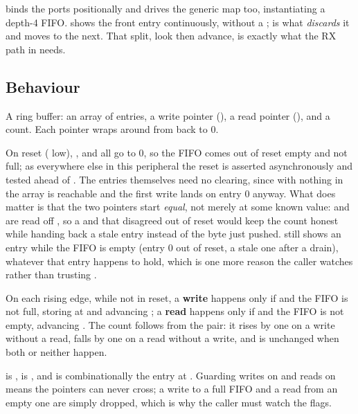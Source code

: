  binds the ports positionally and drives the generic map too, instantiating a depth-4
FIFO.  shows the front entry continuously, without a ;  is what
\emph{discards} it and moves to the next. That split, look then advance, is exactly what the RX path
in  needs.

\subsection{Behaviour}
\label{c4:sec:fifo_behaviour}
A ring buffer: an array of  entries, a write pointer (), a read pointer
(), and a count. Each pointer wraps around from  back to 0.

On reset ( low), ,  and  all go to 0, so the FIFO
comes out of reset empty and not full; as everywhere else in this peripheral the reset is asserted
asynchronously and tested ahead of . The entries themselves need no
clearing, since with  nothing in the array is reachable and the first write lands on
entry 0 anyway. What does matter is that the two pointers start \emph{equal}, not merely at some
known value:  and  are read off , so a  and
 that disagreed out of reset would keep the count honest while handing back a stale entry
instead of the byte just pushed.  still shows an entry while the FIFO is empty (entry 0
out of reset, a stale one after a drain), whatever that entry happens to hold, which is one more
reason the caller watches  rather than trusting .

On each rising edge, while not in reset, a \textbf{write} happens only if  and the
FIFO is not full, storing  at  and advancing ; a \textbf{read}
happens only if  and the FIFO is not empty, advancing . The count follows
from the pair: it rises by one on a write without a read, falls by one on a read without a write,
and is unchanged when both or neither happen.

 is ,  is , and  is
combinationally the entry at . Guarding writes on  and reads on
 means the pointers can never cross; a write to a full FIFO and a read from an empty
one are simply dropped, which is why the caller must watch the flags.

